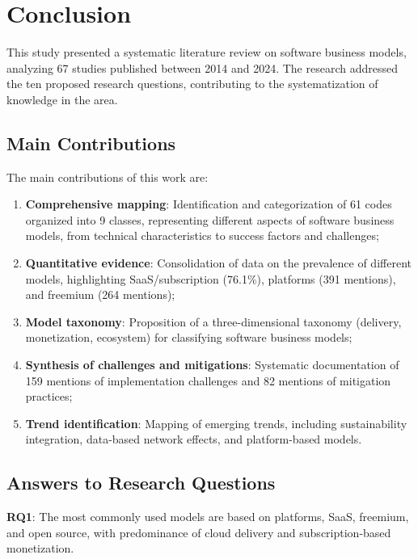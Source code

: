 \documentclass[journal]{IEEEtran}
\begin{document}
\section{Conclusion}\label{sec:conclusion}

This study presented a systematic literature review on software business models, analyzing 67 studies published between 2014 and 2024. The research addressed the ten proposed research questions, contributing to the systematization of knowledge in the area.

\subsection{Main Contributions}

The main contributions of this work are:

\begin{enumerate}
    \item \textbf{Comprehensive mapping}: Identification and categorization of 61 codes organized into 9 classes, representing different aspects of software business models, from technical characteristics to success factors and challenges;

    \item \textbf{Quantitative evidence}: Consolidation of data on the prevalence of different models, highlighting SaaS/subscription (76.1\%), platforms (391 mentions), and freemium (264 mentions);

    \item \textbf{Model taxonomy}: Proposition of a three-dimensional taxonomy (delivery, monetization, ecosystem) for classifying software business models;

    \item \textbf{Synthesis of challenges and mitigations}: Systematic documentation of 159 mentions of implementation challenges and 82 mentions of mitigation practices;

    \item \textbf{Trend identification}: Mapping of emerging trends, including sustainability integration, data-based network effects, and platform-based models.
\end{enumerate}

\subsection{Answers to Research Questions}

\textbf{RQ1}: The most commonly used models are based on platforms, SaaS, freemium, and open source, with predominance of cloud delivery and subscription-based monetization.
\end{document}
